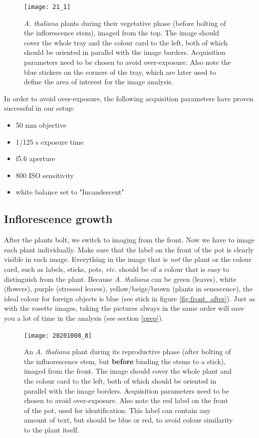 \documentclass[10pt]{article}
\begin{document}
\begin{figure}[!h]
	\centering
	\texttt{[image: 21\_1]}
	\caption[Example image of a top-view image.]{\textit{A. thaliana} plants during their vegetative phase (before bolting of the inflorescence stem), imaged from the top. The image should cover the whole tray and the colour card to the left, both of which should be oriented in parallel with the image borders. Acquisition parameters need to be chosen to avoid over-exposure. Also note the blue stickers on the corners of the tray, which are later used to define the area of interest for the image analysis.}
	\label{fig:top}
\end{figure}

\noindent In order to avoid over-exposure, the following acquisition parameters have proven successful in our setup:

\begin{itemize}
	\item 50 mm objective
	\item 1/125 s exposure time
	\item f5.6 aperture
	\item 800 ISO sensitivity
	\item white balance set to "Incandescent"
\end{itemize}

\subsection{Inflorescence growth}

After the plants bolt, we switch to imaging from the front. Now we have to image each plant individually. Make sure that the label on the front of the pot is clearly visible in each image. Everything in the image that is \textit{not} the plant or the colour card, such as labels, sticks, pots, \textit{etc.} should be of a colour that is easy to distinguish from the plant. Because \textit{A. thaliana} can be green (leaves), white (flowers), purple (stressed leaves), yellow/beige/brown (plants in senescence), the ideal colour for foreign objects is blue (see stick in figure \ref{fig:front_after}). Just as with the rosette images, taking the pictures always in the same order will save you a lot of time in the analysis (see section \ref{prep}).

\begin{figure}[!h]
	\centering
	\texttt{[image: 20201008\_8]}
	\caption[Example image of a front-view image.]{An \textit{A. thaliana} plant during its reproductive phase (after bolting of the influorescence stem, but \textbf{before} binding the stems to a stick), imaged from the front. The image should cover the whole plant and the colour card to the left, both of which should be oriented in parallel with the image borders. Acquisition parameters need to be chosen to avoid over-exposure. Also note the red label on the front of the pot, used for identification. This label can contain any amount of text, but should be blue or red, to avoid colour similarity to the plant itself.}
	\label{fig:front_before}
\end{figure}
\end{document}
